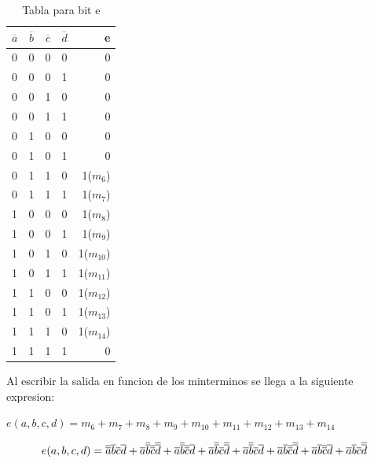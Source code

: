 \documentclass{article}
\begin{document}
			\begin{table}[h!]
			\begin{center}
				\caption{Tabla para bit e}
				\begin{tabular}{l|c|c|c|r}
				\textbf{$\overline{a}$} & \textbf{$\overline{b}$} & \textbf{$\overline{c}$} & \textbf{$\overline{d}$} & \textbf{e}\\
				\hline
				0 & 0 & 0 & 0 & 0\\
				0 & 0 & 0 & 1 & 0\\	
				0 & 0 & 1 & 0 & 0\\
				0 & 0 & 1 & 1 & 0\\
				0 & 1 & 0 & 0 & 0\\
				0 & 1 & 0 & 1 & 0\\	
				0 & 1 & 1 & 0 & 1($m_{6}$)\\
				0 & 1 & 1 & 1 & 1($m_{7}$)\\		
				1 & 0 & 0 & 0 & 1($m_{8}$)\\
				1 & 0 & 0 & 1 & 1($m_{9}$)\\	
				1 & 0 & 1 & 0 & 1($m_{10}$)\\
				1 & 0 & 1 & 1 & 1($m_{11}$)\\
				1 & 1 & 0 & 0 & 1($m_{12}$)\\
				1 & 1 & 0 & 1 & 1($m_{13}$)\\	
				1 & 1 & 1 & 0 & 1($m_{14}$)\\
				1 & 1 & 1 & 1 & 0\\			
				\end{tabular}
			\end{center}
		\end{table}
		\newline Al escribir la salida en funcion de los minterminos se llega a la siguiente expresion:
		\newline \centerline{$e(a,b,c,d)=m_{6}+m_{7}+m_{8}+m_{9}+m_{10}+m_{11}+m_{12}+m_{13}+m_{14}$}
		\begin{equation}
			\centerline{$e(a,b,c,d)=\overline{\overline{a}}\overline{b}\overline{c}\overline{d}+\overline{a}\overline{\overline{b}}\overline{\overline{c}}\overline{\overline{d}}+\overline{a}\overline{\overline{b}}\overline{\overline{c}}\overline{d}+\overline{a}\overline{\overline{b}}\overline{c}\overline{\overline{d}}+\overline{a}\overline{\overline{b}}\overline{c}\overline{d}+\overline{a}\overline{b}\overline{\overline{c}}\overline{\overline{d}}+\overline{a}\overline{b}\overline{\overline{c}}\overline{d}+\overline{a}\overline{b}\overline{c}\overline{\overline{d}}$}
		\end{equation}
\end{document}
